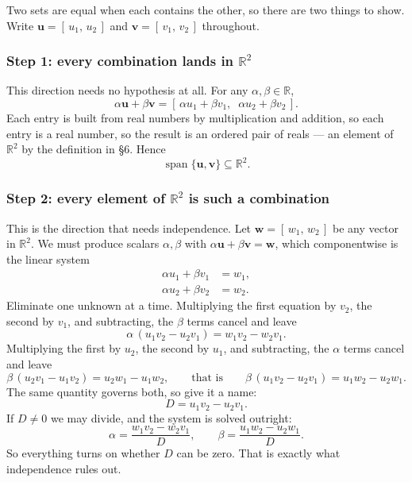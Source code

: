 \documentclass[11pt]{article}
\theoremstyle{definition}
\theoremstyle{remark}
\newcommand{\R}{\mathbb{R}}
\newcommand{\vc}[1]{\mathbf{#1}}
\DeclareMathOperator{\spanop}{span}   %
\begin{document}
\noindent Two sets are equal when each contains the other, so there are two
things to show. Write $\vc{u}=[\,u_1,\,u_2\,]$ and $\vc{v}=[\,v_1,\,v_2\,]$
throughout.

\subsubsection*{Step 1: every combination lands in \texorpdfstring{$\R^{2}$}{R2}}
This direction needs no hypothesis at all. For any $\alpha,\beta\in\R$,
\[
  \alpha\vc{u} + \beta\vc{v}
  = [\,\alpha u_1 + \beta v_1,\;\; \alpha u_2 + \beta v_2\,] .
\]
Each entry is built from real numbers by multiplication and addition, so each
entry is a real number, so the result is an ordered pair of reals --- an element
of $\R^{2}$ by the definition in \S6. Hence
\[
  \spanop\{\vc{u},\vc{v}\} \subseteq \R^{2} .
\]

\subsubsection*{Step 2: every element of \texorpdfstring{$\R^{2}$}{R2} is such a combination}
This is the direction that needs independence. Let $\vc{w}=[\,w_1,\,w_2\,]$ be
any vector in $\R^{2}$. We must produce scalars $\alpha,\beta$ with
$\alpha\vc{u}+\beta\vc{v}=\vc{w}$, which componentwise is the linear system
\begin{equation}
  \begin{aligned}
    \alpha u_1 + \beta v_1 &= w_1, \\
    \alpha u_2 + \beta v_2 &= w_2 .
  \end{aligned}
  \label{eq:span}
\end{equation}
Eliminate one unknown at a time. Multiplying the first equation by $v_2$, the
second by $v_1$, and subtracting, the $\beta$ terms cancel and leave
\[
  \alpha\,(u_1v_2 - u_2v_1) = w_1v_2 - w_2v_1 .
\]
Multiplying the first by $u_2$, the second by $u_1$, and subtracting, the
$\alpha$ terms cancel and leave
\[
  \beta\,(u_2v_1 - u_1v_2) = u_2w_1 - u_1w_2,
  \qquad\text{that is}\qquad
  \beta\,(u_1v_2 - u_2v_1) = u_1w_2 - u_2w_1 .
\]
The same quantity governs both, so give it a name:
\[
  D = u_1v_2 - u_2v_1 .
\]
If $D\neq0$ we may divide, and the system is solved outright:
\begin{equation}
  \alpha = \frac{w_1v_2 - w_2v_1}{D},
  \qquad
  \beta  = \frac{u_1w_2 - u_2w_1}{D} .
  \label{eq:coords}
\end{equation}
So everything turns on whether $D$ can be zero. That is exactly what
independence rules out.
\end{document}
